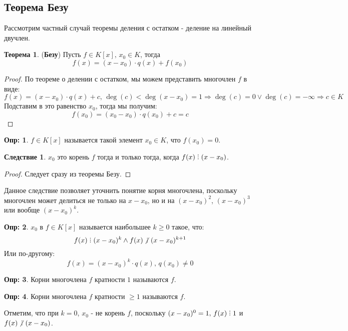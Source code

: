 \documentclass[12pt]{article}
\theoremstyle{definition}
\newtheorem{defn}{Опр:}
\newtheorem{theorem}{Теорема}
\newtheorem{corollary}{Следствие}
\DeclareRobustCommand{\divby}{%
	\mathrel{\text{\vbox{\baselineskip.65ex\lineskiplimit0pt\hbox{.}\hbox{.}\hbox{.}}}}%
}
\DeclareRobustCommand{\ndivby}{\mkern-1mu\not\mathrel{\mkern4.5mu\divby}\mkern1mu}
\begin{document}
\subsection*{Теорема Безу}
Рассмотрим частный случай теоремы деления с остатком - деление на линейный двучлен.
\begin{theorem}(\textbf{Безу})
	Пусть $f \in K[x], \, x_0 \in K$, тогда 
	$$
		f(x) = (x - x_0){\cdot}q(x) + f(x_0)
	$$
\end{theorem}
\begin{proof}
	По теореме о делении с остатком, мы можем представить многочлен $f$ в виде:
	$$
		f(x) = (x - x_0){\cdot}q(x) + c, \, \deg(c) < \deg(x - x_0) = 1 \Rightarrow \deg(c) = 0 \vee \deg(c) = -\infty \Rightarrow c \in K
	$$
	Подставим в это равенство $x_0$, тогда мы получим:
	$$
		f(x_0) = (x_0 - x_0){\cdot}q(x_0) + c = c 
	$$
\end{proof}
\begin{defn}
	 $f \in K[x]$ называется такой элемент $x_0 \in K$, что $f(x_0) = 0$.
\end{defn}

\begin{corollary}
	$x_0$ это корень $f$ тогда и только тогда, когда $f(x) \divby (x- x_0)$.
\end{corollary}
\begin{proof}
	Следует сразу из теоремы Безу.
\end{proof}
Данное следствие позволяет уточнить понятие корня многочлена, поскольку многочлен может делиться не только на $x- x_0$, но и на $(x - x_0)^2$, $(x - x_0)^3$ или вообще $(x - x_0)^k$.
\begin{defn}
	 $x_0$ в $f \in K[x]$ называется наибольшее $k \geq 0 $ такое, что:
	$$
		f(x) \divby (x-x_0)^k \wedge f(x) \ndivby (x - x_0)^{k + 1}
	$$
	Или по-другому:
	$$
		f(x) = (x - x_0)^k{\cdot}q(x), \, q(x_0) \neq 0
	$$
\end{defn}
\begin{defn}
	Корни многочлена $f$ кратности $1$ называются  $f$.
\end{defn}
\begin{defn}
	Корни многочлена $f$ кратности $\geq 1$ называются  $f$.
\end{defn}

Отметим, что при $k = 0$, $x_0$ - не корень $f$, поскольку $(x - x_0)^0 = 1, \, f(x) \divby 1$ и $f(x) \ndivby (x - x_0)$.
\end{document}
